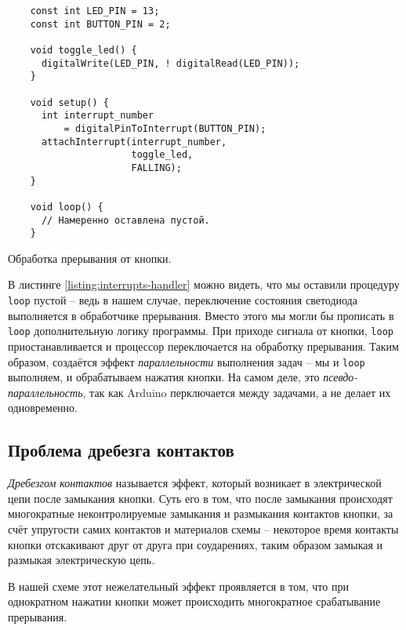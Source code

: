 \documentclass[../sparc.tex]{subfiles}
\begin{document}
\begin{listing}[H]
  \begin{verbatim}
    const int LED_PIN = 13;
    const int BUTTON_PIN = 2;

    void toggle_led() {
      digitalWrite(LED_PIN, ! digitalRead(LED_PIN));
    }

    void setup() {
      int interrupt_number
          = digitalPinToInterrupt(BUTTON_PIN);
      attachInterrupt(interrupt_number,
                      toggle_led,
                      FALLING);
    }

    void loop() {
      // Намеренно оставлена пустой.
    }
  \end{verbatim}
  \caption{Обработка прерывания от кнопки.}
  \label{listing:interrupts-handler}
\end{listing}

В листинге \ref{listing:interrupts-handler} можно видеть, что мы оставили
процедуру \texttt{loop} пустой -- ведь в нашем случае, переключение
состояния светодиода выполняется в обработчике прерывания.  Вместо этого мы
могли бы прописать в \texttt{loop} дополнительную логику программы.
При приходе сигнала от кнопки, \texttt{loop} приостанавливается и
процессор переключается на обработку прерывания.  Таким образом, создаётся
эффект \emph{параллельности} выполнения задач -- мы и \texttt{loop}
выполняем, и обрабатываем нажатия кнопки.  На самом деле, это
\emph{псевдо-параллельность}, так как Arduino перключается между задачами, а не
делает их одновременно.

\subsection{Проблема дребезга контактов}

\emph{Дребезгом контактов} называется эффект, который возникает в электрической
цепи после замыкания кнопки.  Суть его в том, что после замыкания происходят
многократные неконтролируемые замыкания и размыкания контактов кнопки, за счёт
упругости самих контактов и материалов схемы -- некоторое время контакты кнопки
отскакивают друг от друга при соударениях, таким образом замыкая и размыкая
электрическую цепь.

В нашей схеме этот нежелательный эффект проявляется в том, что при однократном
нажатии кнопки может происходить многократное срабатывание прерывания.

\end{document}
